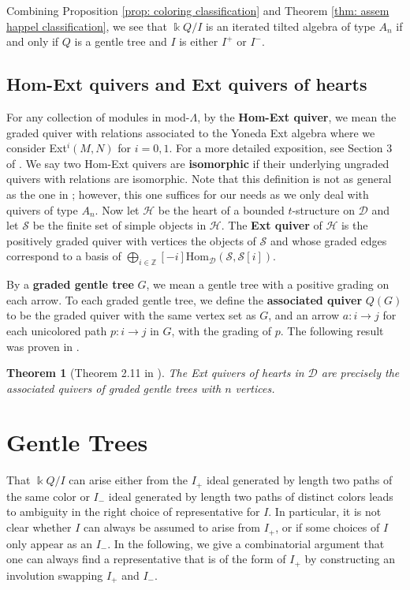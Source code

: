 \documentclass[12pt]{amsart}
\newtheorem{thm}{Theorem}[section]
\theoremstyle{definition}
\theoremstyle{remark}
\numberwithin{equation}{section}
\newcommand{\kk}{\ensuremath{\Bbbk}}
\newcommand{\cD}{\ensuremath{{\mathcal{D}}}}
\newcommand{\cH}{\ensuremath{{\mathcal{H}}}}
\newcommand{\cS}{\ensuremath{{\mathcal{S}}}}
\begin{document}
Combining Proposition \ref{prop: coloring classification} and Theorem \ref{thm: assem happel classification}, we see that $\kk Q/I$ is an iterated tilted algebra of type $A_n$ if and only if $Q$ is a gentle tree and $I$ is either $I^+$ or $I^-$.

\subsection{Hom-Ext quivers and Ext quivers of hearts}

For any collection of modules in mod-$\Lambda$, by the \textbf{Hom-Ext quiver}, we mean the graded quiver with relations associated to the Yoneda Ext algebra where we consider Ext$^i(M,N)$ for $i = 0,1$. For a more detailed exposition, see Section 3 of \cite{igusa2025hom}. We say two Hom-Ext quivers are \textbf{isomorphic} if their underlying ungraded quivers with relations are isomorphic. Note that this definition is not as general as the one in \cite{igusa2025hom}; however, this one suffices for our needs as we only deal with quivers of type $A_n$. Now let $\cH$ be the heart of a bounded $t$-structure on $\cD$ and let $\cS$ be the finite set of simple objects in $\cH$. The \textbf{Ext quiver} of $\cH$ is the positively graded quiver with vertices the objects of $\cS$ and whose graded edges correspond to a basis of $\bigoplus_{i \in \mathbb{Z}}[-i]\text{Hom}_{\cD}(\cS,\cS[i])$.

By a \textbf{graded gentle tree} $G$, we mean a gentle tree with a positive grading on each arrow. To each graded gentle tree, we define the \textbf{associated quiver} $Q(G)$ to be the graded quiver with the same vertex set as $G$, and an arrow $a:i\rightarrow j$ for each unicolored path $p:i\rightarrow j$ in $G$, with the grading of $p$. The following result was proven in \cite{qiu2013ext}.

\begin{thm}[Theorem 2.11 in \cite{qiu2013ext}] \label{thm: Ext hearts quiver of gentle tree}
The Ext quivers of hearts in $\cD$ are precisely the associated quivers of graded gentle trees with $n$ vertices.
\end{thm}

\section{Gentle Trees}
\label{sec: gentle trees}

That $\kk Q/I$ can arise either from the $I_{+}$ ideal generated by length two paths of the same color or $I_{-}$ ideal generated by length two paths of distinct colors leads to ambiguity in the right choice of representative for $I$. In particular, it is not clear whether $I$ can always be assumed to arise from $I_{+}$, or if some choices of $I$ only appear as an $I_{-}$. In the following, we give a combinatorial argument that one can always find a representative that is of the form of $I_{+}$ by constructing an involution swapping $I_{+}$ and $I_{-}$. 
\end{document}
